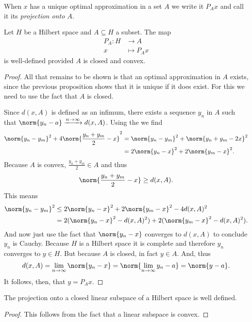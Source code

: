\documentclass[12pt,oneside]{book}
\begin{document}
When \( x \) has a unique optimal approximation in a set \( A \) we write it \( P_A x \)
and call it its \emph{projection onto \( A \)}.
\begin{theorem}
	Let \( H \) be a Hilbert space and \( A \subseteq H \) a subset. The map
	\begin{align*}
		P_A \colon H & \longrightarrow A \\
		x & \longmapsto P_A x
	\end{align*}
	is well-defined provided \( A \) is closed and convex.
\end{theorem}
\begin{proof}
	All that remains to be shown is that an optimal approximation in \( A \) exists, since
	the previous proposition shows that it is unique if it does exist. For this we need to
	use the fact that \( A \) is closed. 

	Since \( d(x,A) \) is defined as an infimum, there exists a sequence \( y_n \) in \( A
	\) such that \( \norm{y_n - a} \xrightarrow{n \to \infty} d(x,A) \). Using the
	 we find
	\begin{align*}
 		\norm{y_n - y_m}^2 + 4\norm{\frac{y_n + y_m}{2} - x}^2 & = \norm{y_n - y_m}^2 +
 		\norm{y_n + y_m - 2x}^2 \\
 																													 & = 2\norm{y_n - x}^2 +
 																													 2\norm{y_m - x}^2.
	\end{align*}
	Because \( A \) is convex, \( \frac{y_n + y_m}{2} \in A \) and thus
	\begin{equation*}
		\norm{\frac{y_n + y_m}{2} - x} \geq d(x,A).
	\end{equation*}
	This means
	\begin{align*}
		\norm{y_n - y_m}^2 & \leq 2\norm{y_n - x}^2 + 2\norm{y_m - x}^2 - 4d(x,A)^2 \\
											 & = 2(\norm{y_n - x}^2 - d(x,A)^2) + 2(\norm{y_m - x}^2 -
											 d(x,A)^2). 
	\end{align*}
	And now just use the fact that \( \norm{y_n - x} \) converges to \( d(x,A) \) to
	conclude \( y_n \) is Cauchy. Because \( H \) is a Hilbert space it is complete and
	therefore \( y_n \) converges to \( y \in H \). But because \( A \) is closed, in fact
	\( y \in A \). And, thus
	\begin{equation*}
		d(x,A) = \lim_{n \to \infty} \norm{y_n - x} = \norm{\lim_{n \to \infty} y_n - a} =
		\norm{y - a}.
	\end{equation*}
	It follows, then, that \( y = P_Ax \).
\end{proof}
\begin{corollary}
	The projection onto a closed linear subspace of a Hilbert space is well defined.
\end{corollary}
\begin{proof}
	This follows from the fact that a linear subspace is convex.
\end{proof}
\end{document}
